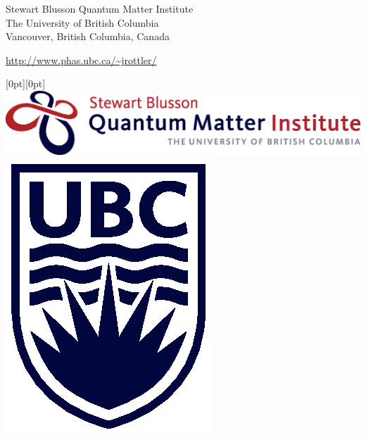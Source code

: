 \documentclass[class=report, float=false, crop=false]{standalone}
\begin{document}
\begin{center}
{\begin{center}
\begin{minipage}{0.5\textwidth}
{Stewart Blusson Quantum Matter Institute \\ The University of British Columbia \\ Vancouver, British Columbia, Canada}

\url{http://www.phas.ubc.ca/~jrottler/}

\end{minipage}

\end{center}
}

\vspace{0.5cm}

\begin{minipage}{\textwidth}
\raisebox{0.9cm}[0pt][0pt]{\includegraphics[scale=0.525]{logoqmi.eps}} \hfill
\hspace{1.5cm} \includegraphics[scale=0.6]{logoubc.eps}
\end{minipage}

\end{center}

\vfill


\newpage
\end{document}
